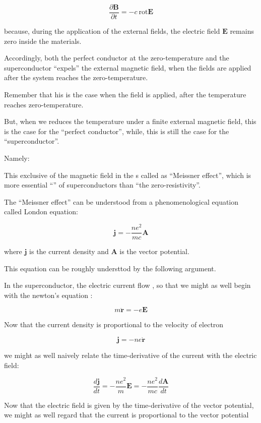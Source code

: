 ﻿\documentclass[twoside]{book}
\numberwithin{equation}{section}
\begin{document}
\[\frac{\partial \bm{B}}{\partial t} = -c\ \text{rot}\bm{E} \]

because, during the application of the external fields, the electric field $\bm{E}$ remains zero inside the materials. 

Accordingly, both the perfect conductor at the zero-temperature and the superconductor ``expels'' the external magnetic field, when the fields are applied {} after the system reaches the zero-temperature. 

Remember that his is the case when the field is applied, after the temperature reaches zero-temperature. 

But, when we reduces the temperature under a finite external magnetic field, this is {} the case for the ``perfect conductor'', while, this is still the case for the ``superconductor''. 

Namely: 

This exclusive of the magnetic field in the {} s called as ``Meissner effect'', which is more essential ``'' of superconductors than ``the zero-resistivity''. 

The ``Meissner effect'' can be understood from a phenomenological equation called London equation: 

\[\bm{j} = -\frac{ne^2}{mc}\bm{A} \]

where $\bm{j}$ is the current density and $\bm{A}$ is the vector potential. 

This equation can be roughly understtod by the following argument. 

In the superconductor, the electric current flow {}, so that we might as well begin with the newton's equation {}: 

\[m\ddot{\bm{r}} = -e\bm{E} \]

Now that the current density is proportional to the velocity of electron

\[\bm{j} = -ne\dot{\bm{r}} \]

we might as well naively relate the time-derivative of the current with the electric field: 

\[\frac{d\bm{j}}{dt} = -\frac{ne^2}{m}\bm{E} = -\frac{ne^2}{mc}\frac{d\bm{A}}{dt} \]

Now that the electric field is given by the time-derivative of the vector potential, we might as well regard that the current is proportional to the vector potential
\end{document}
